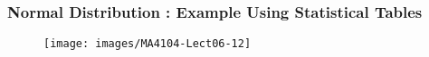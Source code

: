 \documentclass{beamer}
\begin{document}
	\begin{frame}
		\frametitle{Normal Distribution : Example Using Statistical Tables}
		\begin{figure}
			\centering
			\texttt{[image: images/MA4104-Lect06-12]}
			
		\end{figure}
	\end{frame}
\end{document}
